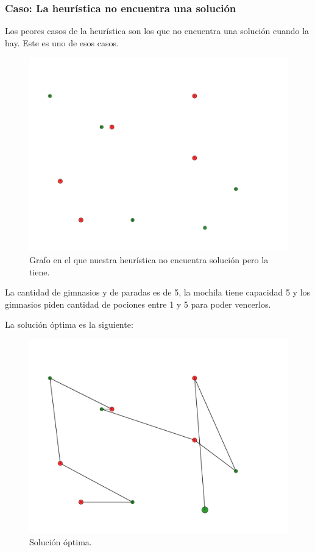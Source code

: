 \subsubsection{Caso: La heurística no encuentra una solución}

Los peores casos de la heurística son los que no encuentra una solución cuando la hay. Este es uno de esos casos.

\begin{figure}[H]
  \begin{center}
    \includegraphics[scale=0.4]{imagenes/test5.pdf}
    \caption{Grafo en el que nuestra heurística no encuentra solución pero la tiene.}
    \label{fig:ej2_caso4}
  \end{center}
\end{figure}

La cantidad de gimnasios y de paradas es de 5, la mochila tiene capacidad 5 y los gimnasios piden cantidad de pociones entre 1 y 5 para poder vencerlos.

La solución óptima es la siguiente:

\begin{figure}[H]
  \begin{center}
    \includegraphics[scale=0.4]{imagenes/test5-soltest5BT.pdf}
    \caption{Solución óptima.}
    \label{fig:ej2_caso4}
  \end{center}
\end{figure}


